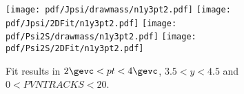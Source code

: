 \begin{figure}[H]
\begin{center}
\texttt{[image: pdf/Jpsi/drawmass/n1y3pt2.pdf]}
\texttt{[image: pdf/Jpsi/2DFit/n1y3pt2.pdf]}
\vspace*{-0.5cm}
\texttt{[image: pdf/Psi2S/drawmass/n1y3pt2.pdf]}
\texttt{[image: pdf/Psi2S/2DFit/n1y3pt2.pdf]}
\vspace*{-0.5cm}
\end{center}
\caption{Fit results in $2\gevc<pt<4\gevc$, $3.5<y<4.5$ and $0<PVNTRACKS<20$.}
\label{Fitn1y3pt2}
\end{figure}
